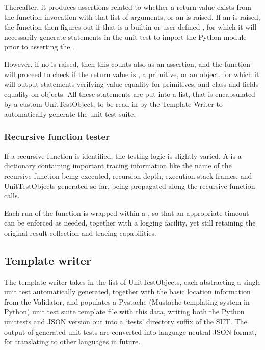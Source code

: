 \documentclass{icldt}
\numberwithin{equation}{section}       %
\begin{document}
{{Thereafter, it produces assertions related to whether a return value exists from the function invocation with that list of arguments, or an  is raised. If an  is raised, the function then figures out if that is a builtin or user-defined , for which it will necessarily generate statements in the unit test to import the  Python module prior to asserting the .

However, if no  is raised, then this counts also as an assertion, and the function will proceed to check if the return value is , a primitive, or an object, for which it will output statements verifying value equality for primitives, and class and fields equality on objects. All these statements are put into a list, that is encapsulated by a custom \textsf{UnitTestObject}, to be read in by the Template Writer to automatically generate the unit test suite.

\subsubsection{Recursive function tester}
If a recursive function is identified, the testing logic is slightly varied. A  is a dictionary containing important tracing information like the name of the recursive function being executed, recursion depth, execution stack frames, and \textsf{UnitTestObject}s generated so far, being propagated along the recursive function calls.

Each run of the function is wrapped within a , so that an appropriate timeout can be enforced as needed, together with a logging facility, yet still retaining the original result collection and tracing capabilities.

\subsection{Template writer}
The template writer takes in the list of \textsf{UnitTestObject}s, each abstracting a single unit test automatically generated, together with the basic location information from the Validator, and populates a \textsf{Pystache} (Mustache templating system in Python) unit test suite template file with this data, writing both the Python unittests and JSON version out into a `tests' directory suffix of the SUT. The output of generated unit tests are converted into language neutral JSON format, for translating to other languages in future.

}}
\end{document}

